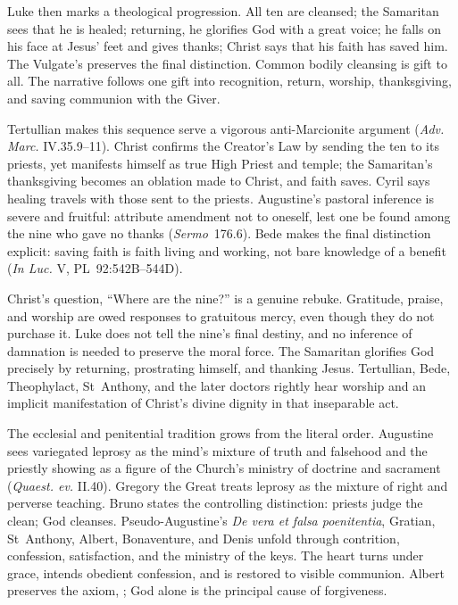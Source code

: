 Luke then marks a theological progression. All ten are cleansed; the Samaritan
sees that he is healed; returning, he glorifies God with a great voice; he falls
on his face at Jesus' feet and gives thanks; Christ says that his faith has
saved him. The Vulgate's  preserves the final
distinction. Common bodily cleansing is gift to all. The narrative follows one
gift into recognition, return, worship, thanksgiving, and saving communion
with the Giver.

Tertullian makes this sequence serve a vigorous anti-Marcionite argument
(\emph{Adv. Marc.} IV.35.9--11). Christ confirms the Creator's Law by sending
the ten to its priests, yet manifests himself as true High Priest and temple;
the Samaritan's thanksgiving becomes an oblation made to Christ, and faith
saves. Cyril says healing travels with those sent to the priests. Augustine's
pastoral inference is severe and fruitful: attribute amendment not to oneself,
lest one be found among the nine who gave no thanks (\emph{Sermo}~176.6). Bede
makes the final distinction explicit: saving faith is faith living and working,
not bare knowledge of a benefit (\emph{In Luc.} V, PL~92:542B--544D).

Christ's question, ``Where are the nine?'' is a genuine rebuke. Gratitude,
praise, and worship are owed responses to gratuitous mercy, even though they do
not purchase it. Luke does not tell the nine's final destiny, and no inference
of damnation is needed to preserve the moral force. The Samaritan glorifies God
precisely by returning, prostrating himself, and thanking Jesus. Tertullian,
Bede, Theophylact, St~Anthony, and the later doctors rightly hear worship and an
implicit manifestation of Christ's divine dignity in that inseparable act.

The ecclesial and penitential tradition grows from the literal order. Augustine
sees variegated leprosy as the mind's mixture of truth and falsehood and the
priestly showing as a figure of the Church's ministry of doctrine and
sacrament (\emph{Quaest. ev.} II.40). Gregory the Great treats leprosy as the
mixture of right and perverse teaching. Bruno states the controlling
distinction: priests judge the clean; God cleanses. Pseudo-Augustine's
\emph{De vera et falsa poenitentia}, Gratian, St~Anthony, Albert, Bonaventure,
and Denis unfold 
through contrition, confession, satisfaction, and the ministry of the keys.
The heart turns under grace, intends obedient confession, and is restored to
visible communion. Albert preserves the axiom, ; God alone is the principal cause of forgiveness.

